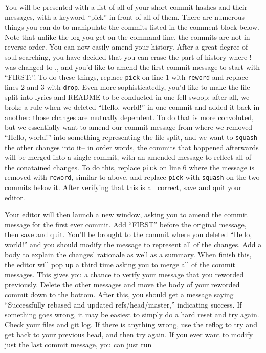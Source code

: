{\par{
You will be presented with a list of all of your short commit hashes and their
messages, with a keyword ``pick'' in front of all of them. There are numerous
things you can do to manipulate the commits listed in the comment block below.
Note that unlike the log you get on the command line, the commits are not in
reverse order. You can now easily amend your history. After a great degree of
soul searching, you have decided that you can erase the part of history where
! was changed to ., and you'd like to amend the first commit message to start
with ``FIRST:''. To do these things, replace \verb+pick+ on line 1 with
\verb+reword+ and replace lines 2 and 3 with \verb+drop+. Even more
sophisticatedly, you'd like to make the file split into lyrics and README to
be conducted in one fell swoop; after all, we broke a rule when we deleted
``Hello, world!'' in one commit and added it back in another: those changes
are mutually dependent. To do that is more convoluted, but we essentially
want to amend our commit message from where we removed ``Hello, world!'' into
something representing the file split, and we want to \verb+squash+ the other
changes into it-- in order words, the commits that happened afterwards will be
merged into a single commit, with an amended message to reflect all of the
conatained changes. To do this, replace \verb+pick+ on line 6 where the
message is removed with \verb+reword+, similar to above, and replace
\verb+pick+ with \verb+squash+ on the two commits below it. After verifying
that this is all correct, save and quit your editor.
}

\par{
Your editor will then launch a new window, asking you to amend the commit
message for the first ever commit. Add ``FIRST'' before the original message,
then save and quit. You'll be brought to the commit where you deleted ``Hello,
world!'' and you should modify the message to represent all of the changes.
Add a body to explain the changes' rationale as well as a summary. When finish
this, the editor will pop up a third time asking you to merge all of the
commit messages. This gives you a chance to verify your message that you
reworded previously. Delete the other messages and move the body of your
reworded commit down to the bottom. After this, you should get a message
saying ``Successfully rebased and updated refs/head/master,'' indicating
success. If something goes wrong, it may be easiest to simply do a hard reset
and try again. Check your files and git log. If there is anything wrong, use
the reflog to try and get back to your previous head, and then try again.
If you ever want to modify just the last commit message, you can just run
}

}
